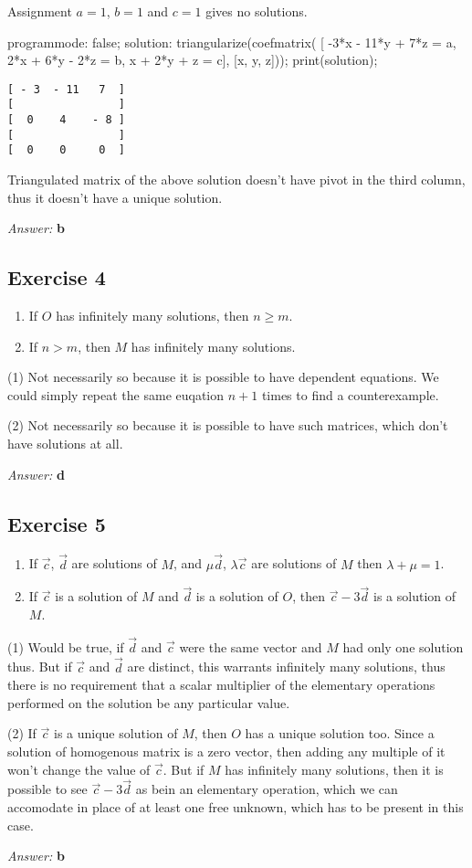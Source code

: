 \documentclass[11pt]{article}
\begin{document}
Assignment $a = 1$, $b = 1$ and $c = 1$ gives no solutions.

\begin{maxima}
programmode: false;
solution: triangularize(coefmatrix(
[ -3*x - 11*y + 7*z = a,
   2*x +  6*y - 2*z = b,
     x +  2*y +   z = c],
     [x, y, z]));
print(solution);
\end{maxima}

\begin{verbatim}
[ - 3  - 11   7  ]
[                ]
[  0    4    - 8 ] 
[                ]
[  0    0     0  ]
\end{verbatim}

Triangulated matrix of the above solution doesn't have pivot in the third
column, thus it doesn't have a unique solution.

\emph{Answer:} \textbf{b}
\subsection{Exercise 4}
\label{sec-2-4}
\begin{enumerate}
\item If $O$ has infinitely many solutions, then $n \geq m$.
\item If $n > m$, then $M$ has infinitely many solutions.
\end{enumerate}

(1) Not necessarily so because it is possible to have dependent equations.
We could simply repeat the same euqation $n+1$ times to find a counterexample.

(2) Not necessarily so because it is possible to have such matrices, which don't
have solutions at all.

\emph{Answer:} \textbf{d}
\subsection{Exercise 5}
\label{sec-2-5}
\begin{enumerate}
\item If $\vec{c}$, $\vec{d}$ are solutions of $M$, and $\mu \vec{d}$, 
      $\lambda \vec{c}$ are solutions of $M$ then $\lambda + \mu = 1$.
\item If $\vec{c}$ is a solution of $M$ and $\vec{d}$ is a solution of $O$, then
      $\vec{c} - 3\vec{d}$ is a solution of $M$.
\end{enumerate}

(1) Would be true, if $\vec{d}$ and $\vec{c}$ were the same vector and $M$ had only
one solution thus.  But if $\vec{c}$ and $\vec{d}$ are distinct, this warrants
infinitely many solutions, thus there is no requirement that a scalar multiplier
of the elementary operations performed on the solution be any particular value.

(2) If $\vec{c}$ is a unique solution of $M$, then $O$ has a unique solution too.
Since a solution of homogenous matrix is a zero vector, then adding any multiple
of it won't change the value of $\vec{c}$.  But if $M$ has infinitely many
solutions, then it is possible to see $\vec{c} - 3\vec{d}$ as bein an elementary
operation, which we can accomodate in place of at least one free unknown, which
has to be present in this case.

\emph{Answer:} \textbf{b}
\end{document}
